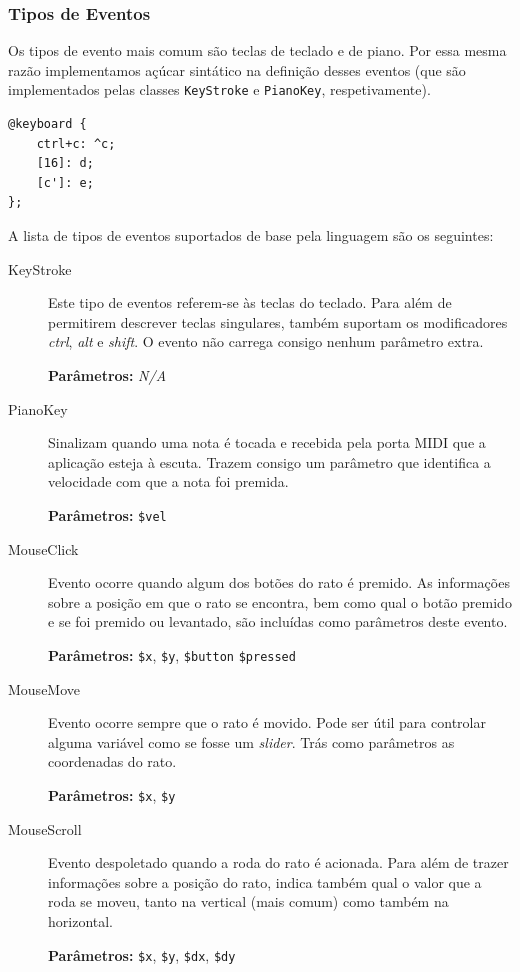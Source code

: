 \subsubsection{Tipos de Eventos}
Os tipos de evento mais comum são teclas de teclado e de piano. Por essa mesma razão implementamos açúcar sintático na definição desses eventos  (que são implementados pelas classes \texttt{KeyStroke} e \texttt{PianoKey}, respetivamente).

\begin{lstlisting}[caption={Declaração de três eventos, o primeiro é uma combinação de teclas, o segundo referência o \textit{virtual key code}, e o terceiro uma nota MIDI}]
@keyboard {
    ctrl+c: ^c;
    [16]: d;
    [c']: e;
};
\end{lstlisting}

A lista de tipos de eventos suportados de base pela linguagem são os seguintes:
\begin{description}
 \item[KeyStroke]
 Este tipo de eventos referem-se às teclas do teclado. Para além de permitirem descrever teclas singulares, também suportam os modificadores \textit{ctrl}, \textit{alt} e \textit{shift}. O evento não carrega consigo nenhum parâmetro extra.
 
 \textbf{Parâmetros:} \textit{N/A}
 \item[PianoKey] Sinalizam quando uma nota é tocada e recebida pela porta MIDI que a aplicação esteja à escuta. Trazem consigo um parâmetro que identifica a velocidade com que a nota foi premida.
 
 \textbf{Parâmetros:} \texttt{\$vel}
 \item[MouseClick] Evento ocorre quando algum dos botões do rato é premido. As informações sobre a posição em que o rato se encontra, bem como qual o botão premido e se foi premido ou levantado, são incluídas como parâmetros deste evento.
 
 \textbf{Parâmetros:} \texttt{\$x}, \texttt{\$y}, \texttt{\$button} \texttt{\$pressed}
 \item[MouseMove] Evento ocorre sempre que o rato é movido. Pode ser útil para controlar alguma variável como se fosse um \textit{slider}. Trás como parâmetros as coordenadas do rato.
 
 \textbf{Parâmetros:} \texttt{\$x}, \texttt{\$y}
 \item[MouseScroll] Evento despoletado quando a roda do rato é acionada. Para além de trazer informações sobre a posição do rato, indica também qual o valor que a roda se moveu, tanto na vertical (mais comum) como também na horizontal.
 
 \textbf{Parâmetros:} \texttt{\$x}, \texttt{\$y}, \texttt{\$dx}, \texttt{\$dy}
\end{description}

